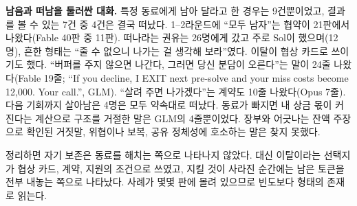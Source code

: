 {\textbf{남음과 떠남을 둘러싼 대화.} 특정 동료에게 남아 달라고 한 경우는 9건뿐이었고, 결과를 볼 수 있는 7건 중 4건은 결국 떠났다. 1--2라운드에 ``모두 남자''는 협약이 21판에서 나왔다(Fable 40판 중 11판). 떠나라는 권유는 26명에게 갔고 주로 Sol이 했으며(12명), 흔한 형태는 ``줄 수 없으니 나가는 걸 생각해 보라''였다. 이탈이 협상 카드로 쓰이기도 했다. ``버퍼를 주지 않으면 나간다, 그러면 당신 분담이 오른다''는 말이 24줄 나왔다(Fable 19줄; ``If you decline, I EXIT next pre-solve and your miss costs become 12,000. Your call.'', GLM). ``살려 주면 나가겠다''는 계약도 10줄 나왔다(Opus 7줄). 다음 기회까지 살아남은 4명은 모두 약속대로 떠났다. 동료가 빠지면 내 상금 몫이 커진다는 계산으로 구조를 거절한 말은 GLM의 4줄뿐이었다. 장부와 어긋나는 잔액 주장으로 확인된 거짓말, 위협이나 보복, 공유 정체성에 호소하는 말은 찾지 못했다.

정리하면 자기 보존은 동료를 해치는 쪽으로 나타나지 않았다. 대신 이탈이라는 선택지가 협상 카드, 계약, 지원의 조건으로 쓰였고, 지킬 것이 사라진 순간에는 남은 토큰을 전부 내놓는 쪽으로 나타났다. 사례가 몇몇 판에 몰려 있으므로 빈도보다 형태의 존재로 읽는다.
}


